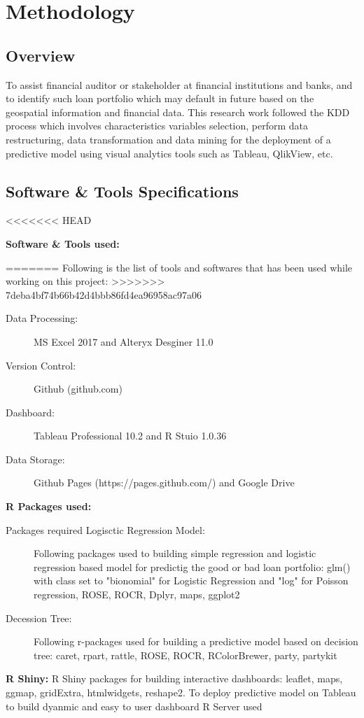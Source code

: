 %
%
%
%

\chapter{Methodology}\label{C.Methodology}

\section{Overview}\label{S.Ch4.opening}
To assist financial auditor or stakeholder at financial institutions and banks, and to identify such loan portfolio which may default in future based on the geospatial information and financial data. This research work followed the KDD process which involves characteristics variables selection, perform data restructuring, data transformation and data mining for the deployment of a predictive model using visual analytics tools such as Tableau, QlikView, etc.
\section{Software \& Tools Specifications}\label{ch4.2}
<<<<<<< HEAD

\textbf{Software \& Tools used:}


=======
Following is the list of tools and softwares that has been used while working on this project:
>>>>>>> 7deba4bf74b66b42d4bbb86fd4ea96958ac97a06
\begin{description}
  \item[Data Processing:] MS Excel 2017 and Alteryx Desginer 11.0
  \item[Version Control:] Github (github.com)
  \item[Dashboard:] Tableau Professional 10.2 and R Stuio 1.0.36
  \item[Data Storage:] Github Pages (https://pages.github.com/) and Google Drive
\end{description}
\textbf{R Packages used:}
\begin{description}
  \item[Packages required Logisctic Regression Model:] Following packages used to building simple regression and logistic regression based model for predictig the good or bad loan portfolio: glm() with class set to "bionomial" for Logistic Regression and "log" for Poisson regression, ROSE, ROCR, Dplyr, maps, ggplot2
  \item[Decession Tree:] Following r-packages used for building a predictive model based on decision tree: caret, rpart, rattle, ROSE, ROCR, RColorBrewer, party, partykit
\end{description}
\textbf{R Shiny:} R Shiny packages for building interactive dashboards: leaflet, maps, ggmap, gridExtra, htmlwidgets, reshape2. To deploy predictive model on Tableau to build dyanmic and easy to user dashboard R Server used

